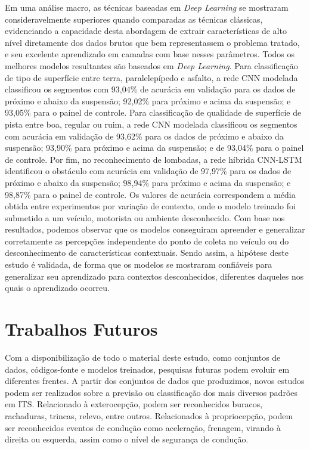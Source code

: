 Em uma análise macro, as técnicas baseadas em \textit{Deep Learning} se mostraram consideravelmente superiores quando comparadas as técnicas clássicas, evidenciando a capacidade desta abordagem de extrair características de alto nível diretamente dos dados brutos que bem representassem o problema tratado, e seu excelente aprendizado em camadas com base nesses parâmetros. Todos os melhores modelos resultantes são baseados em \textit{Deep Learning}. Para classificação de tipo de superfície entre terra, paralelepípedo e asfalto, a rede CNN modelada classificou os segmentos com 93,04\% de acurácia em validação para os dados de próximo e abaixo da suspensão; 92,02\% para próximo e acima da suspensão; e 93,05\% para o painel de controle. Para classificação de qualidade de superfície de pista entre boa, regular ou ruim, a rede CNN modelada classificou os segmentos com acurácia em validação de 93,62\% para os dados de próximo e abaixo da suspensão; 93,90\% para próximo e acima da suspensão; e de 93,04\% para o painel de controle. Por fim, no reconhecimento de lombadas, a rede híbrida CNN-LSTM identificou o obstáculo com acurácia em validação de 97,97\% para os dados de próximo e abaixo da suspensão; 98,94\% para próximo e acima da suspensão; e 98,87\% para o painel de controle. Os valores de acurácia correspondem a média obtida entre experimentos por variação de contexto, onde o modelo treinado foi submetido a um veículo, motorista ou ambiente desconhecido. Com base nos resultados, podemos observar que os modelos conseguiram apreender e generalizar corretamente as percepções independente do ponto de coleta no veículo ou do desconhecimento de características contextuais. Sendo assim, a hipótese deste estudo é validada, de forma que os modelos se mostraram confiáveis para generalizar seu aprendizado para contextos desconhecidos, diferentes daqueles nos quais o aprendizado ocorreu. 

\section{Trabalhos Futuros}

Com a disponibilização de todo o material deste estudo, como conjuntos de dados, códigos-fonte e modelos treinados, pesquisas futuras podem evoluir em diferentes frentes. A partir dos conjuntos de dados que produzimos, novos estudos podem ser realizados sobre a previsão ou classificação dos mais diversos padrões em ITS. Relacionado à exterocepção, podem ser reconhecidos buracos, rachaduras, trincas, relevo, entre outros. Relacionados à propriocepção, podem ser reconhecidos eventos de condução como aceleração, frenagem, virando à direita ou esquerda, assim como o nível de segurança de condução.

